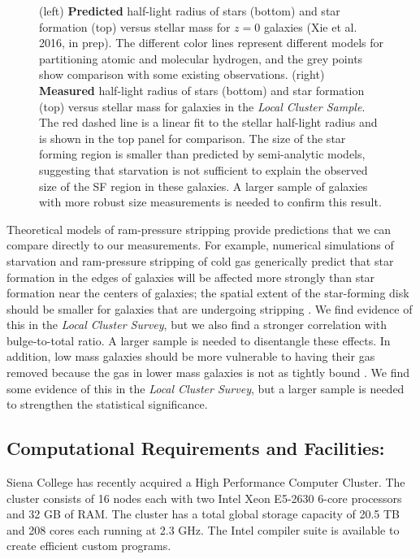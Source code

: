 \documentclass[12pt, preprint]{aastex}
\begin{document}
{\begin{figure}[h!]
\caption{ (left) {\bf Predicted} half-light radius
  of stars (bottom) and star formation (top) versus stellar mass for
  $z = 0 $ galaxies (Xie et al. 2016, in prep).
  The different color lines represent different models for partitioning
  atomic and molecular hydrogen, and the grey points show comparison
  with some existing observations.  
(right) {\bf Measured} half-light radius of stars (bottom) and star
formation (top) versus stellar mass for galaxies in the {\it Local Cluster Sample}.  The
red dashed line is a linear fit to the stellar half-light radius and
is shown in the top panel for comparison.  The size of the star
forming region is smaller than predicted by semi-analytic models,
suggesting that starvation is not sufficient to explain the observed
size of the SF region in these galaxies.  A larger sample of galaxies
with more robust size measurements is needed to confirm this result.}
\label{lizhi_comparison}
\end{figure}



Theoretical models of ram-pressure stripping provide predictions that
we can compare directly to our measurements.
For example, numerical simulations of starvation and ram-pressure stripping of cold gas 
generically predict that star formation in the edges
of galaxies will be affected more strongly than star formation near the
centers of galaxies; the spatial extent of the star-forming disk
should be smaller for galaxies that are undergoing stripping \citep[e.g.][]{kawata08, bekki14}.
We find evidence of this in the {\it Local Cluster Survey}, but we
also find a stronger correlation with bulge-to-total ratio.  A larger
sample is needed to disentangle these effects.
In addition, low mass galaxies should be more
vulnerable to having their gas removed 
because the gas in lower mass galaxies is not as tightly
bound \citep[e.g.][]{kawata08, mccarthy07, bekki14}.  We find
some evidence of this in the {\it Local Cluster Survey}, but a larger
sample is needed to strengthen the statistical significance. 

\vspace*{-1cm}
\subsection{Computational Requirements and
  Facilities:   \label{comp}}
\vspace*{-.4cm}
Siena College has recently acquired a High Performance  Computer
Cluster. The cluster %
consists of 16 nodes each with two
Intel Xeon E5-2630 6-core processors and 32 GB of RAM.  The cluster
has a total global storage capacity of 20.5 TB and 208 cores each
running at 2.3 GHz.  
The Intel
compiler suite is available to create efficient custom programs.


}
\end{document}
